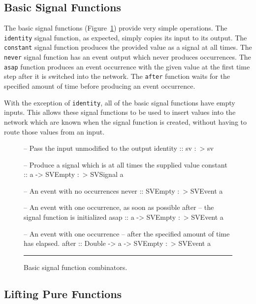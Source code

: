 \subsection{Basic Signal Functions}
\label{subsection:System_Design_and_Interface-Combinators-Basic_Signal_Functions}

The basic signal functions (Figure~\ref{figure:basic_signal_functions})
provide very simple operations. The {\tt identity} signal function, as expected,
simply copies its input to its output. The {\tt constant} signal function
produces the provided value as a signal at all times. The {\tt never} signal
function has an event output which never produces occurrences. The {\tt asap}
function produces an event occurrence with the given value at the first time
step after it is switched into the network. The {\tt after} function waits for
the specified amount of time before producing an event occurrence.

With the exception of {\tt identity}, all of the basic signal functions have
empty inputs. This allows these signal functions to be used to insert values
into the network which are known when the signal function is created, without
having to route those values from an input.

\begin{figure}
\begin{code}
-- Pass the input unmodified to the output
identity :: sv :~> sv

-- Produce a signal which is at all times the supplied value
constant :: a -> SVEmpty :~> SVSignal a

-- An event with no occurrences
never    :: SVEmpty :~> SVEvent a

-- An event with one occurrence, as soon as possible after
-- the signal function is initialized
asap     :: a -> SVEmpty :~> SVEvent a

-- An event with one occurrence
-- after the specified amount of time has elapsed.
after    :: Double -> a -> SVEmpty :~> SVEvent a
\end{code}
\hrule
\caption{Basic signal function combinators.}
\label{figure:basic_signal_functions}
\end{figure}

\subsection{Lifting Pure Functions}
\label{subsection:System_Design_and_Interface-Combinators-Lifting_Pure_Functions}

